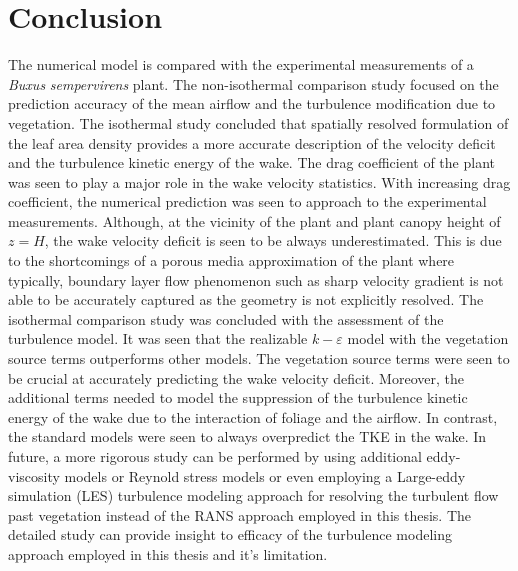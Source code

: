 

\section{Conclusion}

The numerical model is compared with the experimental measurements of a \textit{Buxus} \textit{sempervirens} plant. The non-isothermal comparison study focused on the prediction accuracy of the mean airflow and the turbulence modification due to vegetation. The isothermal study concluded that spatially resolved formulation of the leaf area density provides a more accurate description of the velocity deficit and the turbulence kinetic energy of the wake. The drag coefficient of the plant was seen to play a major role in the wake velocity statistics. With increasing drag coefficient, the numerical prediction was seen to approach to the experimental measurements. Although, at the vicinity of the plant and plant canopy height of $z=H$, the wake velocity deficit is seen to be always underestimated. This is due to the shortcomings of a porous media approximation of the plant where typically, boundary layer flow phenomenon such as sharp velocity gradient is not able to be accurately captured as the geometry is not explicitly resolved. The isothermal comparison study was concluded with the assessment of the turbulence model. It was seen that the realizable $k-\varepsilon$ model with the vegetation source terms outperforms other models. The vegetation source terms were seen to be crucial at accurately predicting the wake velocity deficit. Moreover, the additional terms needed to model the suppression of the turbulence kinetic energy of the wake due to the interaction of foliage and the airflow. In contrast, the standard models were seen to always overpredict the TKE in the wake. In future, a more rigorous study can be performed by using additional eddy-viscosity models or Reynold stress models or even employing a Large-eddy simulation (LES) turbulence modeling approach for resolving the turbulent flow past vegetation instead of the RANS approach employed in this thesis. The detailed study can provide insight to efficacy of the turbulence modeling approach employed in this thesis and it's limitation.

